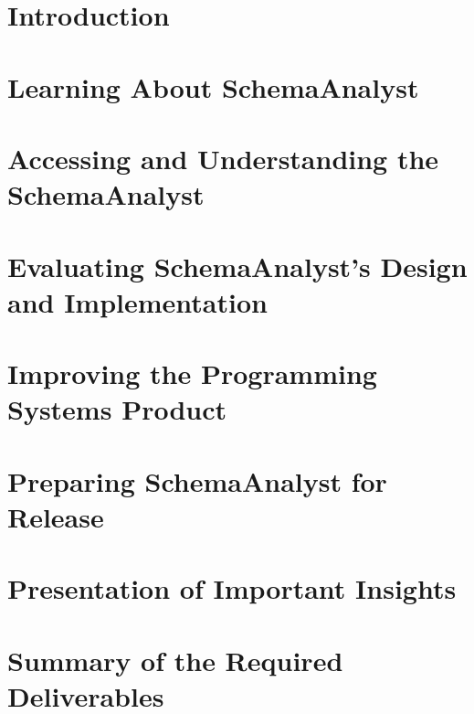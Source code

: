 

\usepackage[compact]{titlesec}



\section*{Introduction}

\section*{Learning About SchemaAnalyst}

\section*{Accessing and Understanding the SchemaAnalyst}

\section*{Evaluating SchemaAnalyst's Design and Implementation}

\section*{Improving the Programming Systems Product}

\section*{Preparing SchemaAnalyst for Release}

\section*{Presentation of Important Insights}

\section*{Summary of the Required Deliverables}

